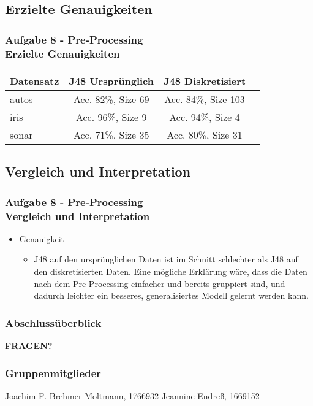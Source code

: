 \documentclass[accentcolor=tud10b,colorbacktitle,inverttitle,landscape,german,presentation,t]{tudbeamer}
\begin{document}
    \subsection{Erzielte Genauigkeiten}
    
    \begin{frame}[t]
    \frametitle{Aufgabe 8 - Pre-Processing\\ Erzielte Genauigkeiten}
        \begin{tabular}[htbp]{l||c|c|c}
            Datensatz & J48 Ursprünglich & J48 Diskretisiert \\
            \hline
            \hline
            autos & Acc. 82\%, Size 69 & Acc. 84\%, Size 103 \\
            \hline
            iris & Acc. 96\%, Size 9 & Acc. 94\%, Size 4 \\
            \hline
            sonar & Acc. 71\%, Size 35 & Acc. 80\%, Size 31 \\
        \end{tabular}
    \end{frame}
    
    \subsection{Vergleich und Interpretation}
    
    \begin{frame}[t]
    \frametitle{Aufgabe 8 - Pre-Processing\\ Vergleich und Interpretation}
        \begin{itemize}
            \item Genauigkeit
            \begin{itemize}
                \item J48 auf den ursprünglichen Daten ist im Schnitt schlechter als J48 auf den diskretisierten Daten. Eine mögliche Erklärung wäre, dass die Daten nach dem Pre-Processing einfacher und bereits gruppiert sind, und dadurch leichter ein besseres, generalisiertes Modell gelernt werden kann.
            \end{itemize}
        \end{itemize}
    \end{frame}

\begin{frame}
\frametitle{Abschlussüberblick}
\tableofcontents
\begin{center}
\textbf{\Large FRAGEN?}
\end{center}
\end{frame}

\begin{frame}
\frametitle{Gruppenmitglieder}
Joachim F. Brehmer-Moltmann, 1766932 \vfill
Jeannine Endreß, 1669152
\end{frame}
\end{document}
